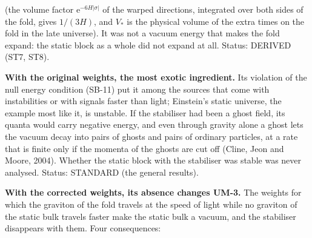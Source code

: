 \documentclass[
  10pt,
]{article}
\begin{document}
(the volume factor \(\mathrm{e}^{-6H\lvert\sigma\rvert}\) of the warped
directions, integrated over both sides of the fold, gives \(1/(3H)\),
and \(V_*\) is the physical volume of the extra times on the fold in the
late universe). It was not a vacuum energy that makes the fold expand:
the static block as a whole did not expand at all. Status: DERIVED (ST7,
ST8).

\textbf{With the original weights, the most exotic ingredient.} Its
violation of the null energy condition (SB-11) put it among the sources
that come with instabilities or with signals faster than light;
Einstein's static universe, the example most like it, is unstable. If
the stabiliser had been a ghost field, its quanta would carry negative
energy, and even through gravity alone a ghost lets the vacuum decay
into pairs of ghosts and pairs of ordinary particles, at a rate that is
finite only if the momenta of the ghosts are cut off (Cline, Jeon and
Moore, 2004). Whether the static block with the stabiliser was stable
was never analysed. Status: STANDARD (the general results).

\textbf{With the corrected weights, its absence changes UM-3.} The
weights for which the graviton of the fold travels at the speed of light
while no graviton of the static bulk travels faster make the static bulk
a vacuum, and the stabiliser disappears with them. Four consequences:
\end{document}
